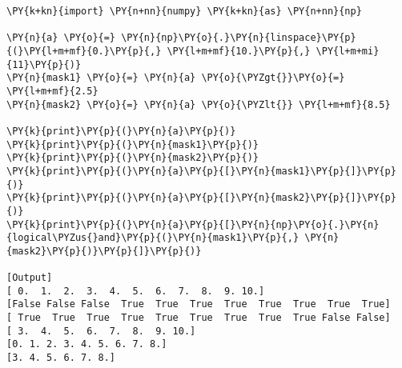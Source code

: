 \begin{Verbatim}[label=\makebox{\url{https://bitbucket.org/lbaldini/programming/src/tip/snippets/numpy\_masks.py}},commandchars=\\\{\}]
\PY{k+kn}{import} \PY{n+nn}{numpy} \PY{k+kn}{as} \PY{n+nn}{np}

\PY{n}{a} \PY{o}{=} \PY{n}{np}\PY{o}{.}\PY{n}{linspace}\PY{p}{(}\PY{l+m+mf}{0.}\PY{p}{,} \PY{l+m+mf}{10.}\PY{p}{,} \PY{l+m+mi}{11}\PY{p}{)}
\PY{n}{mask1} \PY{o}{=} \PY{n}{a} \PY{o}{\PYZgt{}}\PY{o}{=} \PY{l+m+mf}{2.5}
\PY{n}{mask2} \PY{o}{=} \PY{n}{a} \PY{o}{\PYZlt{}} \PY{l+m+mf}{8.5}

\PY{k}{print}\PY{p}{(}\PY{n}{a}\PY{p}{)}
\PY{k}{print}\PY{p}{(}\PY{n}{mask1}\PY{p}{)}
\PY{k}{print}\PY{p}{(}\PY{n}{mask2}\PY{p}{)}
\PY{k}{print}\PY{p}{(}\PY{n}{a}\PY{p}{[}\PY{n}{mask1}\PY{p}{]}\PY{p}{)}
\PY{k}{print}\PY{p}{(}\PY{n}{a}\PY{p}{[}\PY{n}{mask2}\PY{p}{]}\PY{p}{)}
\PY{k}{print}\PY{p}{(}\PY{n}{a}\PY{p}{[}\PY{n}{np}\PY{o}{.}\PY{n}{logical\PYZus{}and}\PY{p}{(}\PY{n}{mask1}\PY{p}{,} \PY{n}{mask2}\PY{p}{)}\PY{p}{]}\PY{p}{)}

[Output]
[ 0.  1.  2.  3.  4.  5.  6.  7.  8.  9. 10.]
[False False False  True  True  True  True  True  True  True  True]
[ True  True  True  True  True  True  True  True  True False False]
[ 3.  4.  5.  6.  7.  8.  9. 10.]
[0. 1. 2. 3. 4. 5. 6. 7. 8.]
[3. 4. 5. 6. 7. 8.]
\end{Verbatim}